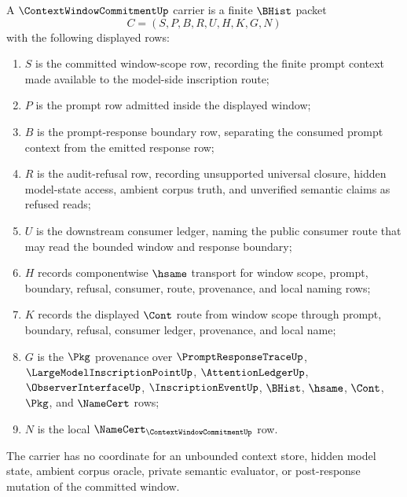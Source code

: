 \begin{definition}
\label{def:context-window-commitment-carrier}
A $\ContextWindowCommitmentUp$ carrier is a finite $\BHist$ packet
$$
C=(S,P,B,R,U,H,K,G,N)
$$
with the following displayed rows:
\begin{enumerate}
\item $S$ is the committed window-scope row, recording the finite prompt context made available to the model-side inscription route;
\item $P$ is the prompt row admitted inside the displayed window;
\item $B$ is the prompt-response boundary row, separating the consumed prompt context from the emitted response row;
\item $R$ is the audit-refusal row, recording unsupported universal closure, hidden model-state access, ambient corpus truth, and unverified semantic claims as refused reads;
\item $U$ is the downstream consumer ledger, naming the public consumer route that may read the bounded window and response boundary;
\item $H$ records componentwise $\hsame$ transport for window scope, prompt, boundary, refusal, consumer, route, provenance, and local naming rows;
\item $K$ records the displayed $\Cont$ route from window scope through prompt, boundary, refusal, consumer ledger, provenance, and local name;
\item $G$ is the $\Pkg$ provenance over $\PromptResponseTraceUp$, $\LargeModelInscriptionPointUp$, $\AttentionLedgerUp$, $\ObserverInterfaceUp$, $\InscriptionEventUp$, $\BHist$, $\hsame$, $\Cont$, $\Pkg$, and $\NameCert$ rows;
\item $N$ is the local $\NameCert_{\ContextWindowCommitmentUp}$ row.
\end{enumerate}
The carrier has no coordinate for an unbounded context store, hidden model state, ambient corpus oracle, private semantic evaluator, or post-response mutation of the committed window.
\end{definition}

